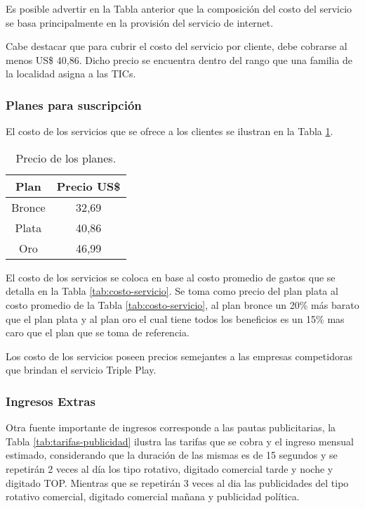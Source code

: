 \begin{itemize}
Es posible advertir en la Tabla anterior que la composición del costo del servicio
se basa principalmente en la provisión del servicio de internet.

Cabe destacar que para cubrir el costo del servicio por cliente, debe cobrarse al menos US\$ 40,86.
Dicho precio se encuentra dentro del rango que una familia de la localidad asigna a las TICs.

\subsubsection{Planes para suscripción}
El costo de los servicios que se ofrece a los clientes se ilustran en la Tabla \ref{tab:precio-planes}.


\begin{table}[H]
  \centering
    \begin{tabular}{|c|c|}
    \hline
    \rowcolor[rgb]{ .773,  .851,  .945} \textbf{Plan} & \textbf{Precio US\$} \bigstrut\\
    \hline
    Bronce & 32,69 \bigstrut\\
    \hline
    Plata & 40,86 \bigstrut\\
    \hline
    Oro   & 46,99 \bigstrut\\
    \hline
    \end{tabular}%
    \caption{Precio de los planes.}
  \label{tab:precio-planes}%
\end{table}%


El costo de los servicios se coloca en base al costo promedio de gastos que se detalla en la Tabla \ref{tab:costo-servicio}. Se toma como precio del plan plata al costo promedio de la Tabla \ref{tab:costo-servicio}, al plan bronce un 20\% más barato que el plan plata y al plan oro el cual tiene todos los beneficios es un 15\% mas caro que el plan que se toma de referencia. 

Los costo de los servicios poseen precios semejantes a las  empresas competidoras que brindan el servicio
Triple Play.


\subsubsection{Ingresos Extras}
Otra fuente importante de ingresos corresponde a las pautas publicitarias, la Tabla \ref{tab:tarifas-publicidad} ilustra las tarifas
que se cobra y el ingreso mensual estimado, considerando que la duración de las mismas es de 15 segundos
y se repetirán 2 veces al día los tipo rotativo, digitado comercial tarde y noche y digitado TOP. Mientras que se repetirán 3 veces al dia las publicidades del tipo rotativo comercial, digitado comercial mañana y publicidad política.


\end{itemize}
